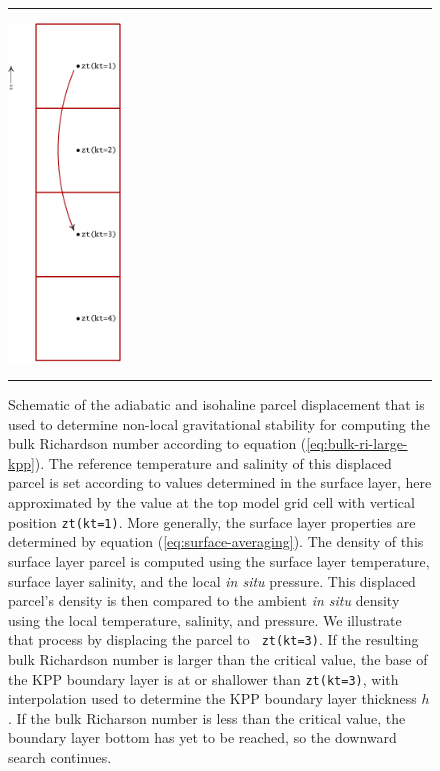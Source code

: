 \begin{figure}[h!t]
\rule{\textwidth}{0.005in}
\begin{center}
\includegraphics[angle=0,width=3cm]{./mfpic_figs/cvmix_stability_nonlocal.pdf}
\caption[Determining non-local gravitational stability]{\sf Schematic
  of the adiabatic and isohaline parcel displacement that is used to
  determine non-local gravitational stability for computing the bulk
  Richardson number according to equation
  (\ref{eq:bulk-ri-large-kpp}).  The reference temperature and
  salinity of this displaced parcel is set according to values
  determined in the surface layer, here approximated by the value at
  the top model grid cell with vertical position {\tt zt(kt=1)}. More
  generally, the surface layer properties are determined by equation
  (\ref{eq:surface-averaging}).  The density of this surface layer
  parcel is computed using the surface layer temperature, surface
  layer salinity, and the local {\it in situ} pressure.  This
  displaced parcel's density is then compared to the ambient {\it in
    situ} density using the local temperature, salinity, and pressure.
  We illustrate that process by displacing the parcel to {\tt
    zt(kt=3)}.  If the resulting bulk Richardson number is larger than
  the critical value, the base of the KPP boundary layer is at or
  shallower than {\tt zt(kt=3)}, with interpolation used to determine
  the KPP boundary layer thickness $h$.  If the bulk Richarson number
  is less than the critical value, the boundary layer bottom has yet
  to be reached, so the downward search continues.}
\label{fig:cvmix_stability_nonlocal}
\end{center}
\rule{\textwidth}{0.005in}
\end{figure}

